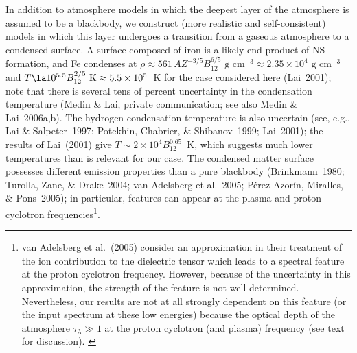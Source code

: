 \documentclass[useAMS,usegraphicx]{mn2e}
\newcommand{\etal}{et al.}
\newcommand{\taulam}{\tau_\lambda}
\begin{document}
In addition to atmosphere models in which the deepest layer
of the atmosphere is assumed to be a blackbody, we construct
(more realistic and self-consistent) models in
which this layer undergoes a transition from a gaseous
atmosphere to a condensed surface.
A surface composed of iron is a likely end-product of NS formation, and
Fe condenses at $\rho\approx 561\,AZ^{-3/5}B_{12}^{6/5}\mbox{ g cm$^{-3}$}
\approx 2.35\times 10^4\mbox{ g cm$^{-3}$}$ and
$T\la 10^{5.5}B_{12}^{2/5}\mbox{ K}\approx 5.5\times 10^5$~K for the
case considered here (Lai~2001); note that there is several tens
of percent uncertainty in the condensation temperature (Medin \& Lai,
private communication; see also Medin \& Lai~2006a,b).
The hydrogen condensation temperature is also uncertain (see, e.g.,
Lai \& Salpeter~1997; Potekhin, Chabrier, \& Shibanov~1999; Lai~2001);
the results of Lai~(2001) give $T\sim 2\times 10^4B_{12}^{0.65}$~K, which
suggests much lower temperatures than is relevant for our case.
The condensed matter surface possesses different emission properties
than a pure blackbody (Brinkmann~1980; Turolla, Zane, \& Drake~2004;
van Adelsberg \etal~2005;
P\'{e}rez-Azor\'{i}n, Miralles, \& Pons~2005); in particular, features can
appear at the plasma and proton cyclotron frequencies\footnote{
van Adelsberg \etal~(2005) consider an approximation in their treatment of
the ion contribution to the dielectric tensor which leads to a spectral
feature at the proton cyclotron frequency.  However, because of the
uncertainty in this approximation, the strength of the feature is not
well-determined.  Nevertheless, our results are not at all strongly
dependent on this feature (or the input spectrum at these low energies)
because the optical depth of the atmosphere $\taulam\gg 1$ at the
proton cyclotron (and plasma) frequency (see text for discussion).
\label{foot:condensed}}.
\end{document}
